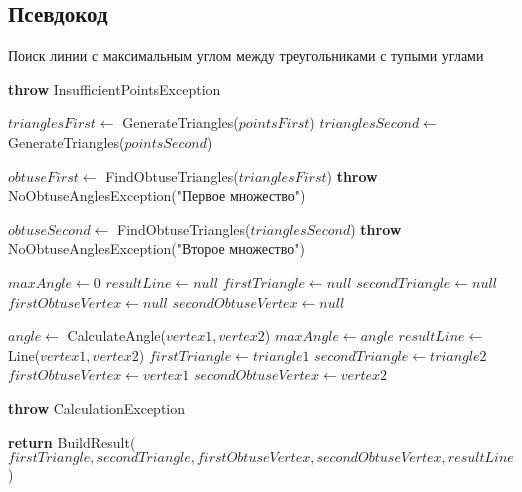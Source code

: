 \documentclass[a4paper,12pt]{article}
\begin{document}
\subsection{Псевдокод}

\begin{algorithm}
\caption{Поиск линии с максимальным углом между треугольниками с тупыми углами}
\begin{algorithmic}[1]
        \State \textbf{throw} InsufficientPointsException
    \EndIf
    
    \State $trianglesFirst \gets$ GenerateTriangles($pointsFirst$)
    \State $trianglesSecond \gets$ GenerateTriangles($pointsSecond$)
    
    \State $obtuseFirst \gets$ FindObtuseTriangles($trianglesFirst$)
        \State \textbf{throw} NoObtuseAnglesException("Первое множество")
    \EndIf
    
    \State $obtuseSecond \gets$ FindObtuseTriangles($trianglesSecond$)
        \State \textbf{throw} NoObtuseAnglesException("Второе множество")
    \EndIf
    
    \State $maxAngle \gets 0$
    \State $resultLine \gets null$
    \State $firstTriangle \gets null$
    \State $secondTriangle \gets null$
    \State $firstObtuseVertex \gets null$
    \State $secondObtuseVertex \gets null$
    
            \State $angle \gets$ CalculateAngle($vertex1, vertex2$)
                \State $maxAngle \gets angle$
                \State $resultLine \gets$ Line($vertex1, vertex2$)
                \State $firstTriangle \gets triangle1$
                \State $secondTriangle \gets triangle2$
                \State $firstObtuseVertex \gets vertex1$
                \State $secondObtuseVertex \gets vertex2$
            \EndIf
        \EndFor
    \EndFor
    
        \State \textbf{throw} CalculationException
    \EndIf
    
    \State \textbf{return} BuildResult($firstTriangle, secondTriangle, firstObtuseVertex, secondObtuseVertex, resultLine$)
\EndProcedure
\end{algorithmic}
\end{algorithm}
\end{document}
